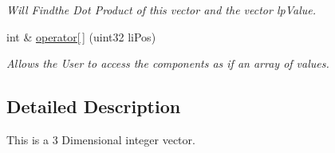 \begin{DoxyCompactItemize}
\begin{DoxyCompactList}\small\item\em Will Findthe Dot Product of this vector and the vector lpValue. \end{DoxyCompactList}\item 
\hypertarget{classc3_d_vi_aa07e4840ce5b3061f667e69e4d240bd7}{
int \& \hyperlink{classc3_d_vi_aa07e4840ce5b3061f667e69e4d240bd7}{operator\mbox{[}$\,$\mbox{]}} (uint32 liPos)}
\label{classc3_d_vi_aa07e4840ce5b3061f667e69e4d240bd7}

\begin{DoxyCompactList}\small\item\em Allows the User to access the components as if an array of values. \end{DoxyCompactList}\end{DoxyCompactItemize}


\subsection{Detailed Description}
This is a 3 Dimensional integer vector. 